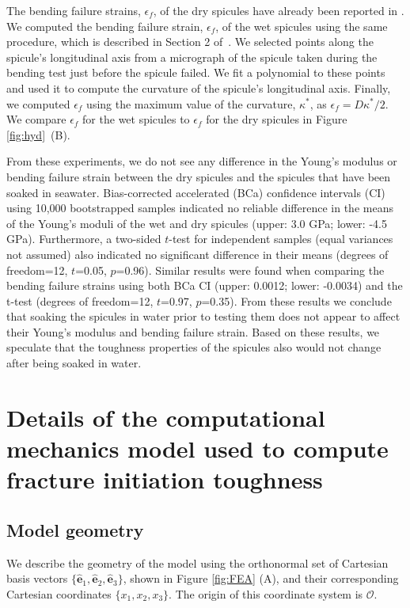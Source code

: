 \documentclass[12pt,onecolumn]{article}
\newcommand{\ex}{{\bm{\hat{e}}}_1}
\newcommand{\ey}{{\bm{\hat{e}}}_2}
\newcommand{\ez}{{\bm{\hat{e}}}_3}
\begin{document}
\begin{bibunit}
The bending failure strains, $\epsilon_f$, of the dry spicules have already been reported in \cite{monn2017enhanced}. We computed the bending failure strain, $\epsilon_f$, of the wet spicules using the same procedure, which is described in Section 2 of~\cite{monn2017enhanced}. We selected points along the spicule's longitudinal axis from a micrograph of the spicule taken during the bending test just before the spicule failed. We fit a polynomial to these points and used it to compute the curvature of the spicule's longitudinal axis. Finally, we computed $\epsilon_f$ using the maximum value of the curvature, $\kappa^*$, as $\epsilon_f=D \kappa^*/2$. We compare $\epsilon_f$ for the wet spicules to $\epsilon_f$ for the dry spicules in Figure \ref{fig:hyd}~(B). 

From these experiments, we do not see any difference in the Young's modulus or bending failure strain between the dry spicules and the spicules that have been soaked in seawater. Bias-corrected accelerated (BCa) confidence intervals (CI) using 10,000 bootstrapped samples indicated no reliable difference in the means of the Young's moduli of the wet and dry spicules (upper: 3.0 GPa; lower: -4.5 GPa). Furthermore, a two-sided $t$-test for independent samples (equal variances not assumed) also indicated no significant difference in their means (degrees of freedom=12, $t$=0.05, $p$=0.96). Similar results were found when comparing the bending failure strains using both BCa CI (upper: 0.0012; lower: -0.0034) and the t-test (degrees of freedom=12, $t$=0.97, $p$=0.35). From these results we conclude that soaking the spicules in water prior to testing them does not appear to affect their Young's modulus and bending failure strain. Based on these results, we speculate that the toughness properties of the spicules also would not change after being soaked in water.

\section{Details of the computational mechanics model used to compute fracture initiation toughness}
\label{sec:Vextmethod}

\subsection{Model geometry}
We describe the geometry of the model using the orthonormal set of Cartesian basis vectors $\{\ex,\ey,\ez\}$, shown in Figure \ref{fig:FEA} (A), and their corresponding Cartesian coordinates $\{x_1,x_2,x_3\}$. The origin of this coordinate system is $\mathcal{O}$.


\end{bibunit}
\end{document}
